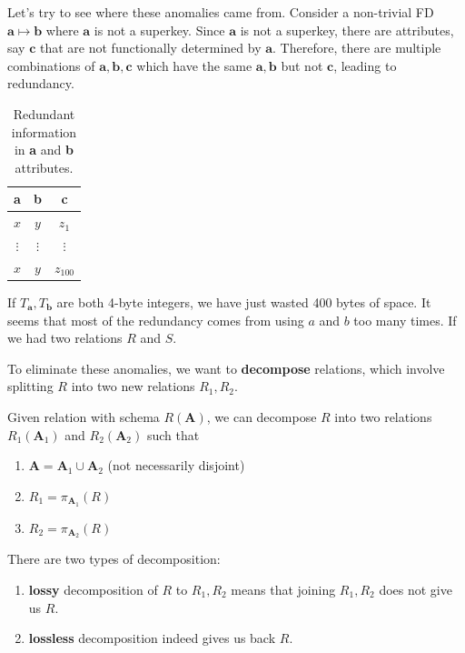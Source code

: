   \begin{example}[Redundancies]
    \label{ex:redundancies}
    Let's try to see where these anomalies came from. Consider a non-trivial FD $\mathbf{a} \mapsto \mathbf{b}$ where $\mathbf{a}$ is not a superkey. Since $\mathbf{a}$ is not a superkey, there are attributes, say $\mathbf{c}$ that are not functionally determined by $\mathbf{a}$. Therefore, there are multiple combinations of $\mathbf{a, b, c}$ which have the same $\mathbf{a, b}$ but not $\mathbf{c}$, leading to redundancy. 

    \begin{table}[H]
      \centering
      \begin{tabular}{|c|c|c|}
        \hline
        \textbf{a} & \textbf{b} & \textbf{c} \\
        \hline
        $x$ & $y$ & $z_1$ \\ 
        $\vdots$ & $\vdots$ & $\vdots$ \\ 
        $x$ & $y$ & $z_{100}$ \\
        \hline
      \end{tabular}
      \caption{Redundant information in \textbf{a} and \textbf{b} attributes. }
      \label{tab:redundant}
    \end{table}
    If $T_{\mathbf{a}}, T_{\mathbf{b}}$ are both 4-byte integers, we have just wasted 400 bytes of space. It seems that most of the redundancy comes from using $a$ and $b$ too many times. If we had two relations $R$ and $S$. 
  \end{example}

  To eliminate these anomalies, we want to \textbf{decompose} relations, which involve splitting $R$ into two new relations $R_1, R_2$. 

  \begin{definition}[Decomposition]
    \label{def:decomposition}
    Given relation with schema $R(\mathbf{A})$, we can decompose $R$ into two relations $R_1 (\mathbf{A}_1)$ and $R_2 (\mathbf{A}_2)$ such that 
    \begin{enumerate}
      \item $\mathbf{A} = \mathbf{A}_1 \cup \mathbf{A}_2$ (not necessarily disjoint)
      \item $R_1 = \pi_{\mathbf{A}_1} (R)$
      \item $R_2 = \pi_{\mathbf{A}_2} (R)$
    \end{enumerate}
    There are two types of decomposition: 
    \begin{enumerate}
      \item \textbf{lossy} decomposition of $R$ to $R_1, R_2$ means that joining $R_1, R_2$ does not give us $R$. 
      \item \textbf{lossless} decomposition indeed gives us back $R$. 
    \end{enumerate}
  \end{definition}

